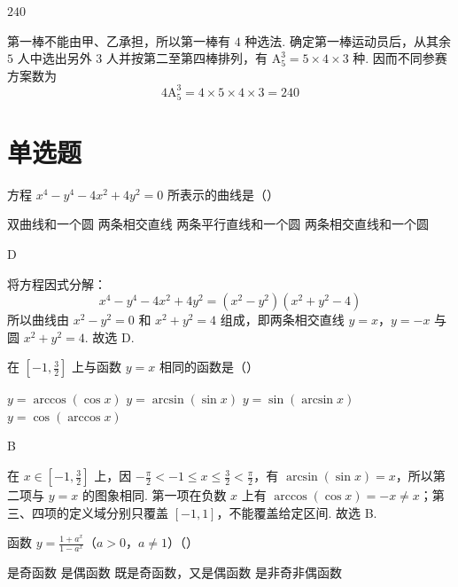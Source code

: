 \begin{answer}
\(240\)
\end{answer}

\begin{solution}
第一棒不能由甲、乙承担，所以第一棒有 \(4\) 种选法. 确定第一棒运动员后，从其余 \(5\) 人中选出另外 \(3\) 人并按第二至第四棒排列，有 \(\mathrm A_5^3=5\times4\times3\) 种. 因而不同参赛方案数为
\[
4\mathrm A_5^3=4\times5\times4\times3=240
\]
\end{solution}

\section{单选题}

\begin{problem}
方程 \(x^4-y^4-4x^2+4y^2=0\) 所表示的曲线是（\quad）

\choices
    {双曲线和一个圆}
    {两条相交直线}
    {两条平行直线和一个圆}
    {两条相交直线和一个圆}
\end{problem}

\begin{answer}
D
\end{answer}

\begin{solution}
将方程因式分解：
\[
x^4-y^4-4x^2+4y^2=(x^2-y^2)(x^2+y^2-4)
\]
所以曲线由 \(x^2-y^2=0\) 和 \(x^2+y^2=4\) 组成，即两条相交直线 \(y=x\)，\(y=-x\) 与圆 \(x^2+y^2=4\). 故选 D.
\end{solution}

\begin{problem}
在 \(\left[ -1,\frac{3}{2} \right]\) 上与函数 \(y=x\) 相同的函数是（\quad）

\choices
    {\(y=\arccos(\cos x)\)}
    {\(y=\arcsin(\sin x)\)}
    {\(y=\sin(\arcsin x)\)}
    {\(y=\cos(\arccos x)\)}
\end{problem}

\begin{answer}
B
\end{answer}

\begin{solution}
在 \(x\in[-1,\frac32]\) 上，因 \(-\frac\pi2<-1\leqslant x\leqslant\frac32<\frac\pi2\)，有 \(\arcsin(\sin x)=x\)，所以第二项与 \(y=x\) 的图象相同. 第一项在负数 \(x\) 上有 \(\arccos(\cos x)=-x\ne x\)；第三、四项的定义域分别只覆盖 \([-1,1]\)，不能覆盖给定区间. 故选 B.
\end{solution}

\begin{problem}
函数 \(y=\frac{1+a^x}{1-a^x}\)（\(a>0\)，\(a\ne1\)）（\quad）

\choices
    {是奇函数}
    {是偶函数}
    {既是奇函数，又是偶函数}
    {是非奇非偶函数}
\end{problem}

